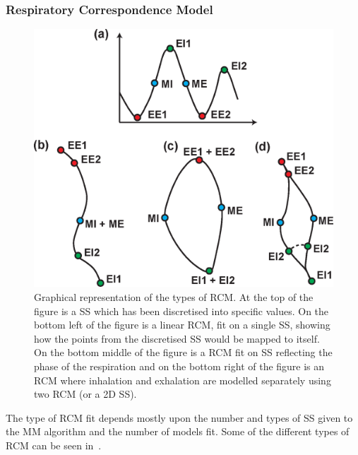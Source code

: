             \subsubsection{Respiratory Correspondence Model} \label{sec:respiratory_correspondence_model}
                \begin{figure}
                    \centering
                            
                    \includegraphics[width=1.0\linewidth]{figures/background_rcm.png}
                            
                    \captionsetup{singlelinecheck=false}
                    \caption{
                        Graphical representation of the types of \gls{RCM}. At the top of the figure is a \gls{SS} which has been discretised into specific values. On the bottom left of the figure is a linear \gls{RCM}, fit on a single \gls{SS}, showing how the points from the discretised \gls{SS} would be mapped to itself. On the bottom middle of the figure is a \gls{RCM} fit on \gls{SS} reflecting the phase of the respiration and on the bottom right of the figure is an \gls{RCM} where inhalation and exhalation are modelled separately using two \gls{RCM} (or a \gls{2D} \gls{SS}).
                    }
                    \label{fig:motion_modelling_rcm}
                \end{figure}
                
                The type of \gls{RCM} fit depends mostly upon the number and types of \gls{SS} given to the \gls{MM} algorithm and the number of models fit. Some of the different types of \gls{RCM} can be seen in~.

